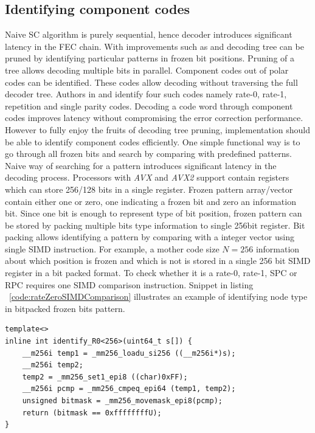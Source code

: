 \subsection{Identifying component codes}
Naive SC algorithm is purely sequential, hence decoder introduces significant latency in the FEC chain. With improvements such as \cite{fastSSC} and \cite{SSC} decoding tree can be pruned by identifying particular patterns in frozen bit positions. Pruning of a tree allows decoding multiple bits in parallel. Component codes out of polar codes can be identified. These codes allow decoding without traversing the full decoder tree. Authors in \cite{SSC} and \cite{fastSSC} identify four such codes namely rate-0, rate-1, repetition and single parity codes. Decoding a code word through component codes improves latency without compromising the error correction performance. However to fully enjoy the fruits of decoding tree pruning, implementation should be able to identify component codes efficiently. One simple functional way is to go through all frozen bits and search by comparing with predefined patterns. Naive way of searching for a pattern introduces significant latency in the decoding process. Processors with \textit{AVX} and \textit{AVX2} support contain registers which can store 256/128 bits in a single register. Frozen pattern array/vector contain either one or zero, one indicating a frozen bit and zero an information bit. Since one bit is enough to represent type of bit position, frozen pattern can be stored by packing multiple bits type information to single 256bit register. Bit packing allows identifying a pattern by comparing with a integer vector using single SIMD instruction. For example, a mother code size $N=256$ information about which position is frozen and which is not is stored in a single 256 bit SIMD register in a bit packed format. To check whether it is a rate-0, rate-1, SPC or RPC requires one SIMD comparison instruction. Snippet in listing ~\ref{code:rateZeroSIMDComparison} illustrates an example of identifying node type in bitpacked frozen bits pattern.
\begin{code}
	\label{code:rateZeroSIMDComparison}
	\begin{verbatim}
template<>
inline int identify_R0<256>(uint64_t s[]) {
	__m256i temp1 = _mm256_loadu_si256 ((__m256i*)s);
	__m256i temp2;
	temp2 = _mm256_set1_epi8 ((char)0xFF);
	__m256i pcmp = _mm256_cmpeq_epi64 (temp1, temp2);
	unsigned bitmask = _mm256_movemask_epi8(pcmp);
	return (bitmask == 0xffffffffU);
}
\end{verbatim}
\end{code}

